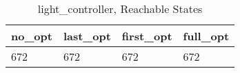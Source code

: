 \begin{table}
\caption{light\_controller, Reachable States}
\label{light_controller_reach}
\begin{tabular}{llll}
\toprule
no\_opt & last\_opt & first\_opt & full\_opt \\
\midrule
672 & 672 & 672 & 672 \\
\bottomrule
\end{tabular}
\end{table}

